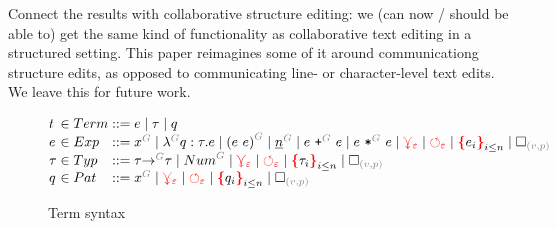 \documentclass[nonacm, acmsmall, screen, review]{acmart}
\newcommand{\e}{\varepsilon}
\newcommand{\id}[1]{\textcolor{gray}{\ensuremath{#1}}}
\newcommand{\eid}[2]{{#2}^{\id{#1}}}
\newcommand{\conflictHole}[1]{%
{\noexpandarg\StrSubstitute{#1}{,}{\textcolor{red}{\,\textbf{|}\,}}[\myargs]%
{\textcolor{red}{\textbf{\{}}\myargs\textcolor{red}{\textbf{\}}}}}}%
\newcommand{\emptyHole}[2]{\square_{\id{(#1, #2)}}}
\newcommand{\eVar}[2]{\eid{#1}{#2}}
\newcommand{\eFun}[4]{\eid{#1}{\lambda} #2 : #3 . #4}
\newcommand{\eApp}[3]{\eid{#1}{\left(#2~#3\right)}}
\newcommand{\eNum}[2]{\eid{#1}{\underline{#2}}}
\newcommand{\ePlus}[3]{#2~\eid{#1}{\texttt{+}}~#3}
\newcommand{\eTimes}[3]{#2~\eid{#1}{\texttt{*}}~#3}
\newcommand{\pVar}[2]{\eid{#1}{#2}}
\newcommand{\tArrow}[3]{#2 \eid{#1}{\rightarrow} #3}
\newcommand{\tNum}[1]{\eid{#1}{Num}}
\newcommand{\multiVertex}[1]{\textcolor{red}{\ensuremath{\curlyveedownarrow_{#1}}}}
\newcommand{\cycleVertex}[1]{\textcolor{red}{\ensuremath{\circlearrowleft_{#1}}}}
\begin{document}
Connect the results with collaborative structure editing: we (can now / should be able to) get the same kind of functionality as collaborative text editing in a structured setting. This paper reimagines some of it around communicationg structure edits, as opposed to communicating line- or character-level text edits.
We leave this for future work.



\begin{figure}
  \[
    \arraycolsep=0pt
    \begin{array}{lcllll}
      t & {}\in{} & Term & {}::={} &
        e
        \mid \tau
        \mid q
      \\
      e & {}\in{} & Exp & {}::={} &
        \eVar{G}{x}
        \mid \eFun{G}{q}{\tau}{e}
        \mid \eApp{G}{e}{e}
        \mid \eNum{G}{n}
        \mid \ePlus{G}{e}{e}
        \mid \eTimes{G}{e}{e}
        \mid \multiVertex{\e}
        \mid \cycleVertex{\e}
        \mid \conflictHole{e_i}_{i \leq n}
        \mid \emptyHole{v}{p}
      \\
      \tau & {}\in{} & Typ & {}::={} &
        \tArrow{G}{\tau}{\tau}
        \mid \tNum{G}
        \mid \multiVertex{\e}
        \mid \cycleVertex{\e}
        \mid \conflictHole{\tau_i}_{i \leq n}
        \mid \emptyHole{v}{p}
      \\
      q & {}\in{} & Pat{} & {}::={} &
        \pVar{G}{x}
        \mid \multiVertex{\e}
        \mid \cycleVertex{\e}
        \mid \conflictHole{q_i}_{i \leq n}
        \mid \emptyHole{v}{p}
      \\
    \end{array}
  \]  
  \caption{Term syntax}
  \label{fig:Term syntax}
\end{figure}%



\end{document}
